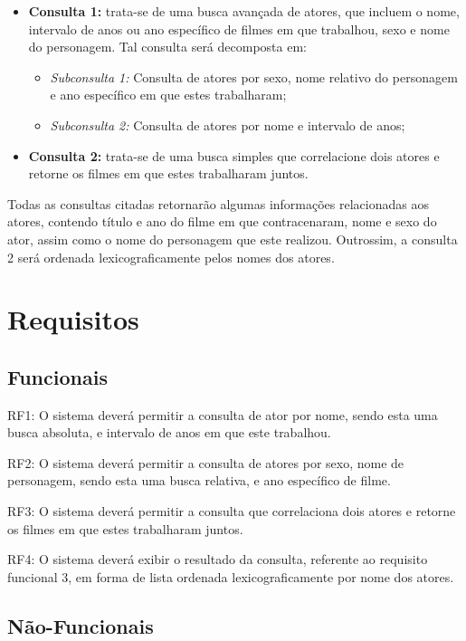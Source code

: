 \documentclass[
	12pt,				%
	oneside,			%
	a4paper,			%
	brazil				%
	]{abntex2}
\begin{document}
\begin{itemize}

\item \textbf{Consulta 1:} trata-se de uma busca avançada de atores, que incluem o nome, intervalo de anos ou ano específico de filmes em que trabalhou, sexo e nome do personagem. Tal consulta será decomposta em:
\begin{itemize}
\item\textit{ Subconsulta 1:} Consulta de atores por sexo, nome relativo do personagem e ano específico em que estes trabalharam;
\item \textit{Subconsulta 2:} Consulta de atores por nome e intervalo de anos;
\end{itemize}
\item \textbf{Consulta 2:} trata-se de uma busca simples que correlacione dois atores e retorne os filmes em que estes trabalharam juntos.
\end{itemize}

Todas as consultas citadas retornarão algumas informações relacionadas aos atores, contendo título e ano do filme em que contracenaram, nome e sexo do ator, assim como o nome do personagem que este realizou. Outrossim, a consulta 2 será ordenada lexicograficamente pelos nomes dos atores.

\chapter{Requisitos}
\section{Funcionais}
RF1: O sistema deverá permitir a consulta de ator por nome, sendo esta uma busca absoluta, e intervalo de anos em que este trabalhou.

RF2: O sistema deverá permitir a consulta de atores por sexo, nome de personagem, sendo esta uma busca relativa, e ano específico de filme.

RF3: O sistema deverá permitir a consulta que correlaciona dois atores e retorne os filmes em que estes trabalharam juntos.

RF4: O sistema deverá exibir o resultado da consulta, referente ao requisito funcional 3, em forma de lista
ordenada lexicograficamente por nome dos atores.


\section{Não-Funcionais}
\end{document}
